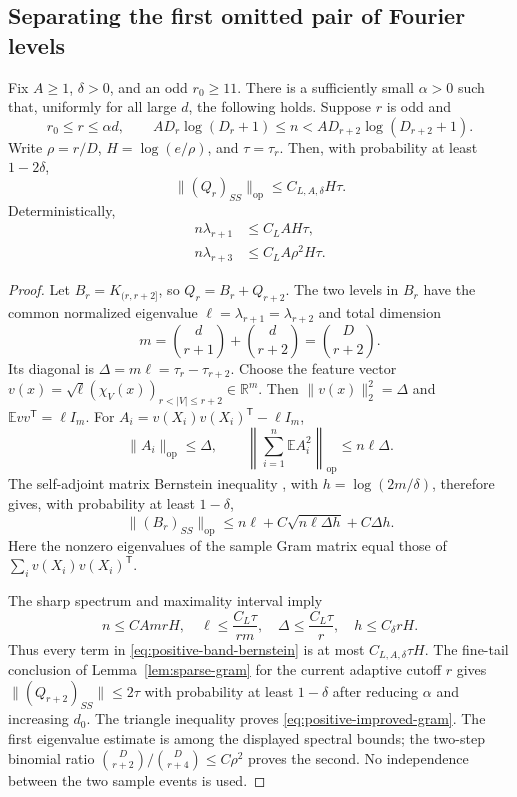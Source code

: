 \subsection{Separating the first omitted pair of Fourier levels}
\begin{lemma}
\label{lem:positive-first-shell}
Fix $A\ge1$, $\delta>0$, and an odd $r_0\ge11$.
There is a sufficiently small $\alpha>0$ such that, uniformly for all
large $d$, the following holds. Suppose $r$ is odd and
\[
 r_0\le r\le\alpha d,\qquad
 A D_r\log(D_r+1)\le n<A D_{r+2}\log(D_{r+2}+1).
\]
Write $\rho=r/D$, $H=\log(e/\rho)$, and $\tau=\tau_r$.
Then, with probability at least $1-2\delta$,
\begin{equation}
 \|(Q_r)_{SS}\|_{\mathrm{op}}\le C_{L,A,\delta}H\tau.
 \label{eq:positive-improved-gram}
\end{equation}
Deterministically,
\begin{align}
 n\lambda_{r+1}&\le C_L A H\tau,
 \label{eq:positive-first-eigen}\\
 n\lambda_{r+3}&\le C_L A\rho^2H\tau.
 \label{eq:positive-second-eigen}
\end{align}
\end{lemma}
\begin{proof}
Let $B_r=K_{(r,r+2]}$, so $Q_r=B_r+Q_{r+2}$.
The two levels in $B_r$ have the common normalized eigenvalue
$\ell=\lambda_{r+1}=\lambda_{r+2}$ and total dimension
\[
 m=\binom d{r+1}+\binom d{r+2}=\binom D{r+2}.
\]
Its diagonal is $\Delta=m\ell=\tau_r-\tau_{r+2}$.
Choose the feature vector
$v(x)=\sqrt\ell(\chi_V(x))_{r<|V|\le r+2}\in\mathbb R^m$.
Then $\|v(x)\|_2^2=\Delta$ and
$\mathbb E vv^{\mathsf T}=\ell I_m$.
For $A_i=v(X_i)v(X_i)^{\mathsf T}-\ell I_m$,
\[
 \|A_i\|_{\mathrm{op}}\le\Delta,\qquad
 \left\|\sum_{i=1}^n\mathbb E A_i^2\right\|_{\mathrm{op}}
 \le n\ell\Delta.
\]
The self-adjoint matrix Bernstein inequality
\cite[Theorem~1.4]{tropp2012}, with $h=\log(2m/\delta)$, therefore gives,
with probability at least $1-\delta$,
\begin{equation}
 \|(B_r)_{SS}\|_{\mathrm{op}}
 \le n\ell+C\sqrt{n\ell\Delta h}+C\Delta h.
 \label{eq:positive-band-bernstein}
\end{equation}
Here the nonzero eigenvalues of the sample Gram matrix equal those of
$\sum_i v(X_i)v(X_i)^{\mathsf T}$.

The sharp spectrum and maximality interval imply
\[
 n\le C A m rH,\quad
 \ell\le\frac{C_L\tau}{rm},\quad
 \Delta\le\frac{C_L\tau}{r},\quad
 h\le C_\delta rH.
\]
Thus every term in \eqref{eq:positive-band-bernstein} is at most
$C_{L,A,\delta}\tau H$.
The fine-tail conclusion of Lemma~\ref{lem:sparse-gram} for the current
adaptive cutoff $r$ gives $\|(Q_{r+2})_{SS}\|\le2\tau$ with probability
at least $1-\delta$
after reducing $\alpha$ and increasing $d_0$.
The triangle inequality proves \eqref{eq:positive-improved-gram}.
The first eigenvalue estimate is among the displayed spectral bounds;
the two-step binomial ratio
$\binom D{r+2}/\binom D{r+4}\le C\rho^2$ proves the second.
No independence between the two sample events is used.
\end{proof}


